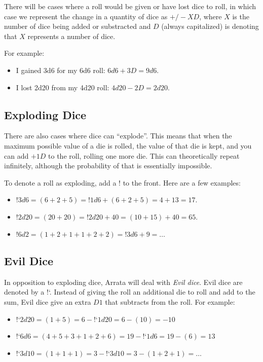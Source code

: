 \documentclass[../main.tex]{subfiles}
\begin{document}
    There will be cases where a roll would be given or have lost dice to roll, in which case we represent the change in a quantity of dice as $+/-XD$, where $X$ is the number of dice being added or substracted and $D$ (always capitalized) is denoting that $X$ represents a number of dice.

    For example:
    \begin{itemize}
        \item I gained 3d6 for my 6d6 roll: $6d6 + 3D = 9d6$.
        \item I lost 2d20 from my 4d20 roll: $4d20 - 2D = 2d20$.
    \end{itemize}

    \subsection{Exploding Dice}

    There are also cases where dice can ``explode''. This means that when the maximum possible value of a die is rolled, the value of that die is kept, and you can add $+1D$ to the roll, rolling one more die. This can theoretically repeat infinitely, although the probability of that is essentially impossible.

    To denote a roll as exploding, add a $!$ to the front. Here are a few examples:

    \begin{itemize}
        \item $!3d6 = (6 + 2 + 5) = !1d6 + (6 + 2 + 5) = 4 + 13 = 17$.
        \item $!2d20 = (20 + 20) = !2d20 + 40 = (10 + 15) + 40 = 65$.
        \item $!6d2 = (1 + 2 + 1 + 1 + 2 + 2) = !3d6 + 9 = \dots$
    \end{itemize}

    \subsection{Evil Dice}

    In opposition to exploding dice, Arrata will deal with {\em Evil dice}. Evil dice are denoted by a !`. Instead of giving the roll an additional die to roll and add to the sum, Evil dice give an extra $D1$ that subtracts from the roll. For example:

    \begin{itemize}
        \item!`$2d20 = (1 + 5) = 6 - $!`$1d20 = 6 - (10) = -10$
        \item!`$6d6 = (4 + 5 + 3 + 1 + 2 + 6) = 19 - $!`$1d6 = 19 - (6) = 13$
        \item!`$3d10 = (1 + 1 + 1) = 3 - $!`$3d10 = 3 - (1 + 2 + 1) = \dots$
    \end{itemize}
\end{document}
